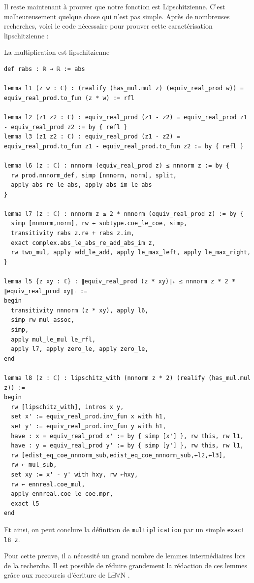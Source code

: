 \documentclass[a4paper, 11pt, twoside]{report}
\newcommand{\LEAN}{L$\exists\forall$N }
\begin{document}
Il reste maintenant à prouver que notre fonction est Lipschitzienne. C'est malheureusement quelque chose qui n'est pas simple. Après de nombreuses recherches, voici le code nécessaire pour prouver cette caractérisation lipschitzienne :

\begin{code}{La multiplication est lipschitzienne}
\begin{lstlisting}
def rabs : ℝ → ℝ := abs

lemma l1 (z w : ℂ) : (realify (has_mul.mul z) (equiv_real_prod w)) = equiv_real_prod.to_fun (z * w) := rfl

lemma l2 (z1 z2 : ℂ) : equiv_real_prod (z1 - z2) = equiv_real_prod z1 - equiv_real_prod z2 := by { refl }
lemma l3 (z1 z2 : ℂ) : equiv_real_prod (z1 - z2) = equiv_real_prod.to_fun z1 - equiv_real_prod.to_fun z2 := by { refl }

lemma l6 (z : ℂ) : nnnorm (equiv_real_prod z) ≤ nnnorm z := by {
  rw prod.nnnorm_def, simp [nnnorm, norm], split,
  apply abs_re_le_abs, apply abs_im_le_abs
}

lemma l7 (z : ℂ) : nnnorm z ≤ 2 * nnnorm (equiv_real_prod z) := by {
  simp [nnnorm,norm], rw ← subtype.coe_le_coe, simp,
  transitivity rabs z.re + rabs z.im,
  exact complex.abs_le_abs_re_add_abs_im z,
  rw two_mul, apply add_le_add, apply le_max_left, apply le_max_right,
}

lemma l5 {z xy : ℂ} : ∥equiv_real_prod (z * xy)∥₊ ≤ nnnorm z * 2 * ∥equiv_real_prod xy∥₊ :=
begin
  transitivity nnnorm (z * xy), apply l6,
  simp_rw mul_assoc,
  simp,
  apply mul_le_mul le_rfl,
  apply l7, apply zero_le, apply zero_le,
end

lemma l8 (z : ℂ) : lipschitz_with (nnnorm z * 2) (realify (has_mul.mul z)) :=
begin
  rw [lipschitz_with], intros x y,
  set x' := equiv_real_prod.inv_fun x with h1,
  set y' := equiv_real_prod.inv_fun y with h1,
  have : x = equiv_real_prod x' := by { simp [x'] }, rw this, rw l1,
  have : y = equiv_real_prod y' := by { simp [y'] }, rw this, rw l1,
  rw [edist_eq_coe_nnnorm_sub,edist_eq_coe_nnnorm_sub,←l2,←l3],
  rw ← mul_sub,
  set xy := x' - y' with hxy, rw ←hxy,
  rw ← ennreal.coe_mul,
  apply ennreal.coe_le_coe.mpr,
  exact l5
end
\end{lstlisting}
\end{code}
	
Et ainsi, on peut conclure la définition de \verb|multiplication| par un simple \verb|exact l8 z|.
	
Pour cette preuve, il a nécessité un grand nombre de lemmes intermédiaires lors de la recherche. Il est possible de réduire grandement la rédaction de ces lemmes grâce aux raccourcis d'écriture de \LEAN.
\end{document}

